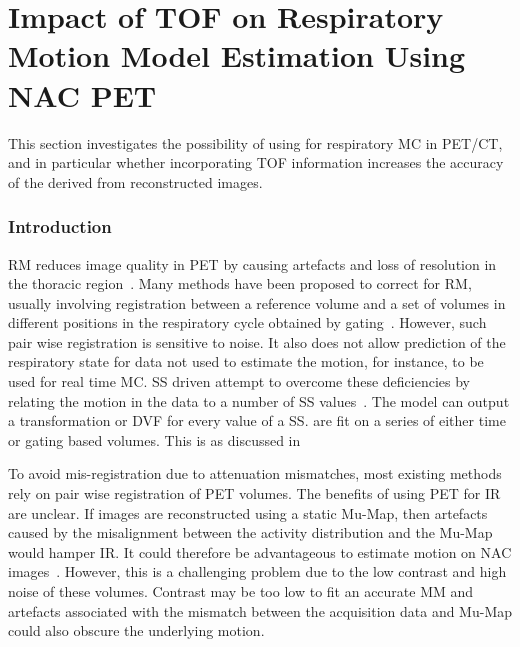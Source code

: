 \chapter{Impact of TOF on Respiratory Motion Model Estimation Using NAC PET} \label{sec:impact_of_tof_on_respiratory_motion_model_estimation_using_nac_pet"}
    
    
        This section investigates the possibility of using  for respiratory \gls{MC} in \gls{PET}/\gls{CT}, and in particular whether incorporating \gls{TOF} information increases the accuracy of the  derived from  reconstructed images.
        
        \subsection{Introduction} \label{sec:impact_of_tof_on_respiratory_motion_model_estimation_using_pre_gated_no_intra_cycle_motion_nac_pet_introduction}
        \gls{RM} reduces image quality in \gls{PET} by causing artefacts and loss of resolution in the thoracic region~. Many methods have been proposed to correct for \gls{RM}, usually involving registration between a reference volume and a set of volumes in different positions in the respiratory cycle obtained by gating~. However, such pair wise registration is sensitive to noise. It also does not allow prediction of the respiratory state for data not used to estimate the motion, for instance, to be used for real time \gls{MC}. \gls{SS} driven  attempt to overcome these deficiencies by relating the motion in the data to a number of \gls{SS} values~. The model can output a transformation or \gls{DVF} for every value of a \gls{SS}.  are fit on a series of either time or gating based volumes. This is as discussed in~

        To avoid mis-registration due to attenuation mismatches, most existing methods rely on pair wise registration of  \gls{PET} volumes. The benefits of using  \gls{PET} for \gls{IR} are unclear. If images are reconstructed using a static \gls{Mu-Map}, then artefacts caused by the misalignment between the activity distribution and the \gls{Mu-Map} would hamper \gls{IR}. It could therefore be advantageous to estimate motion on \gls{NAC} images~. However, this is a challenging problem due to the low contrast and high noise of these volumes. Contrast may be too low to fit an accurate \gls{MM} and artefacts associated with the mismatch between the acquisition data and \gls{Mu-Map} could also obscure the underlying motion.
        
